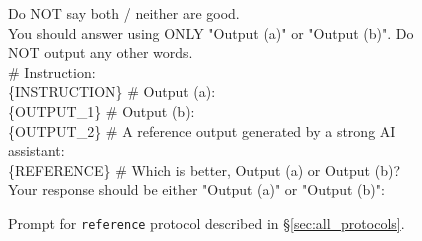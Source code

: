 \begin{figure*}[t!]
\begin{tcolorbox}[colback=black!3!white, colframe=black!70!white, title=Reference, fontupper=\footnotesize, fonttitle=\footnotesize]
Do NOT say both / neither are good.\\
You should answer using ONLY "Output (a)" or "Output (b)". Do NOT output any other words.\\
\newline
\newline
\# Instruction: \\
\{INSTRUCTION\}
\newline\newline
\# Output (a): \\
\{OUTPUT\_1\}
\newline\newline
\# Output (b):\\
\{OUTPUT\_2\}
\newline\newline
\# A reference output generated by a strong AI assistant: \\
\{REFERENCE\}
\newline
\newline
\# Which is better, Output (a) or Output (b)? Your response should be either "Output (a)" or "Output (b)":
\end{tcolorbox}
\caption{Prompt for \texttt{reference} protocol described in \S\ref{sec:all_protocols}.}
\label{fig:prompt_reference}
\end{figure*}



